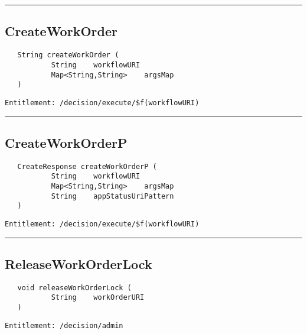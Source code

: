 \rule{12cm}{2pt}
\subsection{CreateWorkOrder}
\label{Api:CreateWorkOrder}
\begin{verbatim}
   String createWorkOrder (
           String    workflowURI
           Map<String,String>    argsMap
   )
\end{verbatim}
\begin{Verbatim}[fontsize=\small, formatcom=\color{Maroon}]
  Entitlement: /decision/execute/$f(workflowURI)
\end{Verbatim}



\rule{12cm}{2pt}
\subsection{CreateWorkOrderP}
\label{Api:CreateWorkOrderP}
\begin{verbatim}
   CreateResponse createWorkOrderP (
           String    workflowURI
           Map<String,String>    argsMap
           String    appStatusUriPattern
   )
\end{verbatim}
\begin{Verbatim}[fontsize=\small, formatcom=\color{Maroon}]
  Entitlement: /decision/execute/$f(workflowURI)
\end{Verbatim}



\rule{12cm}{2pt}
\subsection{ReleaseWorkOrderLock}
\label{Api:ReleaseWorkOrderLock}
\begin{verbatim}
   void releaseWorkOrderLock (
           String    workOrderURI
   )
\end{verbatim}
\begin{Verbatim}[fontsize=\small, formatcom=\color{Maroon}]
  Entitlement: /decision/admin
\end{Verbatim}



